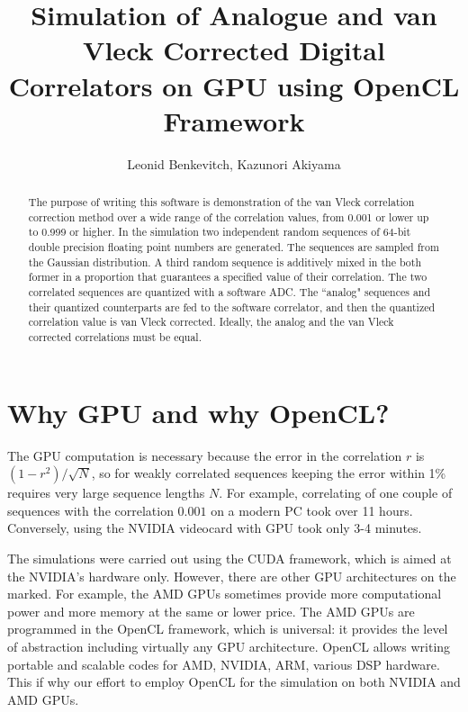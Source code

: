 \documentclass[preprint2]{aastex}
\begin{document}
\title{Simulation of Analogue and van Vleck Corrected Digital Correlators on GPU using OpenCL Framework}

\author{Leonid Benkevitch, Kazunori Akiyama}

\begin{abstract} \small 
The purpose of writing this software is demonstration of the van Vleck correlation correction method over a wide range of the correlation values, from 0.001 or lower up to 0.999 or higher. In the simulation two independent random sequences of 64-bit double precision floating point numbers are generated. The sequences are sampled from the Gaussian distribution. A third random sequence is additively mixed in the both former in a proportion that guarantees a specified value of their correlation. The two correlated sequences are quantized with a software ADC. The ``analog" sequences and their quantized counterparts are fed to the software correlator, and then the quantized correlation value is van Vleck corrected. Ideally, the analog and  the van Vleck corrected correlations must be equal.\\
\end{abstract}



\section{Why GPU and why OpenCL?}\label{why_gpu}
The GPU computation is necessary because the error in the correlation $r$ is $(1-r^2)/\sqrt{N}$, so for weakly correlated sequences keeping the error within 1\% requires very large sequence lengths $N$. For example, correlating of one couple of sequences with the correlation $0.001$ on a modern PC took over 11 hours. Conversely, using the NVIDIA videocard with GPU took only 3-4 minutes.

The simulations were carried out using the CUDA framework, which is aimed at the NVIDIA's hardware only. However, there are other GPU architectures on the marked. For example, the AMD GPUs sometimes provide more computational power and more memory at the same or lower price. The AMD GPUs are programmed in the OpenCL framework, which is universal: it provides the level of abstraction including virtually any GPU architecture. OpenCL allows writing portable and scalable codes for AMD, NVIDIA, ARM, various DSP hardware. This if why our effort to employ OpenCL for the simulation on both NVIDIA and AMD GPUs. 
\end{document}
